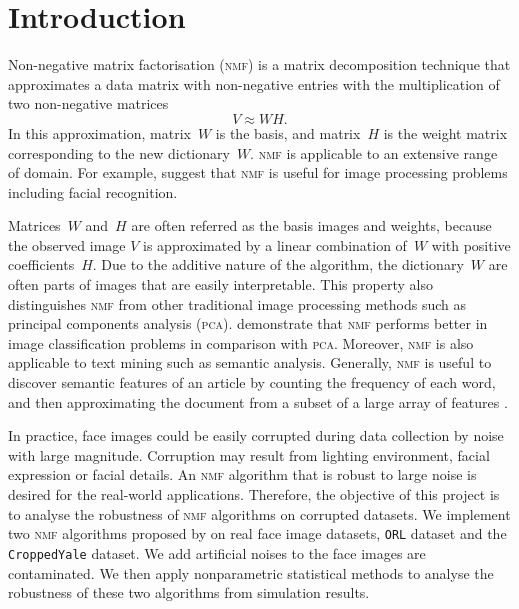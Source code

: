 \section{Introduction\label{chapter1}}
Non-negative matrix factorisation (\textsc{nmf}) is a matrix decomposition technique that approximates a data matrix with non-negative entries with the multiplication of two non-negative matrices
\begin{equation*}
  V \approx WH.
\end{equation*}
In this approximation, matrix~$W$ is the basis, and matrix~$H$ is the weight matrix corresponding to the new dictionary~$W$. \textsc{nmf}
is applicable to an extensive range of domain. For example, \citet{lee1999learning} suggest that \textsc{nmf} is useful for image processing problems including facial recognition.

Matrices~$W$ and~$H$ are often referred as the basis images and weights, 
because the observed image $V$ is approximated by a linear combination of~$W$ with positive coefficients~$H$.
Due to the additive nature of the algorithm, the dictionary~$W$ are often parts of images that are easily interpretable.
This property also distinguishes \textsc{nmf} from other traditional image processing methods such as principal components analysis (\textsc{pca}).
\citet{guillamet2002non} demonstrate that \textsc{nmf} performs better in image classification problems in comparison with \textsc{pca}.
Moreover, \textsc{nmf} is also applicable to text mining such as semantic analysis.
Generally, \textsc{nmf} is useful to discover semantic features of an article by counting the frequency of each word, and then approximating the document from a subset of a large array of features \citep{lee1999learning}.

In practice, face images could be easily corrupted during data collection by noise with large magnitude. Corruption may result from lighting environment, facial expression or facial details. An \textsc{nmf} algorithm that is robust to large noise is desired for the real-world applications. Therefore, the objective of this project is to analyse the robustness of \textsc{nmf} algorithms on corrupted datasets. We implement two \textsc{nmf} algorithms proposed by \citet{lee2001algorithms} on real face image datasets, \texttt{ORL} dataset and the \texttt{CroppedYale} dataset. We add artificial noises to the face images are contaminated. We then apply nonparametric statistical methods to analyse the robustness of these two algorithms from simulation results.

